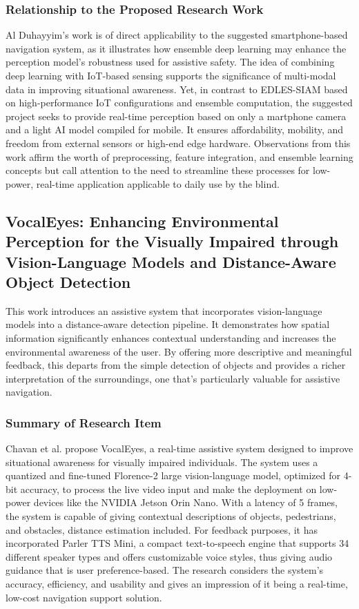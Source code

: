 \documentclass{FastFyp}
\begin{document}
\subsubsection{Relationship to the Proposed Research Work}

Al Duhayyim's \cite{ref:al2025ensemble} work is of direct applicability to the suggested smartphone-based navigation system, as it illustrates how ensemble deep learning may enhance the perception model's robustness used for assistive safety. The idea of combining deep learning with IoT-based sensing supports the significance of multi-modal data in improving situational awareness. Yet, in contrast to EDLES-SIAM based on high-performance IoT configurations and ensemble computation, the suggested project seeks to provide real-time perception based on only a martphone camera and a light AI model compiled for mobile. It ensures affordability, mobility, and freedom from external sensors or high-end edge hardware. Observations from this work affirm the worth of preprocessing, feature integration, and ensemble learning concepts but call attention to the need to streamline these processes for low-power, real-time application applicable to daily use by the blind. 

\subsection{VocalEyes: Enhancing Environmental Perception for the Visually Impaired through Vision-Language Models and Distance-Aware Object Detection}
This work introduces an assistive system that incorporates vision-language models into a distance-aware detection pipeline. It demonstrates how spatial information significantly enhances contextual understanding and increases the environmental awareness of the user. By offering more descriptive and meaningful feedback, this departs from the simple detection of objects and provides a richer interpretation of the surroundings, one that's particularly valuable for assistive navigation.

\subsubsection{Summary of Research Item}  
Chavan et al. \cite{ref:chavan2024vocaleyes} propose VocalEyes, a real-time assistive system designed to improve situational awareness for visually impaired individuals. The system uses a quantized and fine-tuned Florence-2 large vision-language model, optimized for 4-bit accuracy, to process the live video input and make the deployment on low-power devices like the NVIDIA Jetson Orin Nano. With a latency of 5 frames, the system is capable of giving contextual descriptions of objects, pedestrians, and obstacles, distance estimation included. For feedback purposes, it has incorporated Parler TTS Mini, a compact text-to-speech engine that supports 34 different speaker types and offers customizable voice styles, thus giving audio guidance that is user preference-based. The research considers the system's accuracy, efficiency, and usability and gives an impression of it being a real-time, low-cost navigation support solution.
\end{document}

